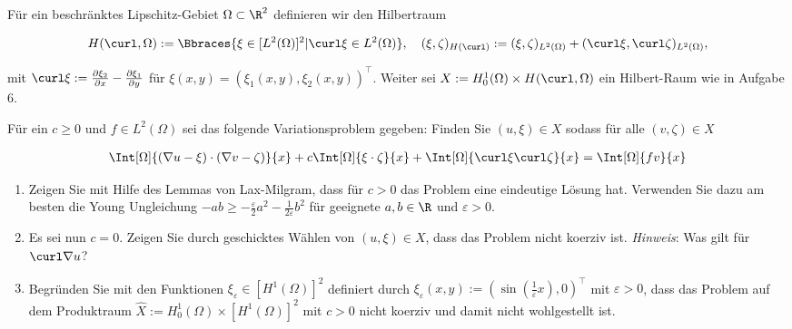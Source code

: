 
\begin{exercise}

Für ein beschränktes Lipschitz-Gebiet $\Omega \subset \R^2$ definieren wir den Hilbertraum

\begin{align*}
  H(\curl, \Omega)
  :=
  \Bbraces{\xi \in [L^2(\Omega)]^2 | \curl \xi \in L^2(\Omega)},
  \quad
  (\xi, \zeta)_{H(\curl)}
  :=
  (\xi, \zeta)_{L^2(\Omega)} + (\curl \xi, \curl \zeta)_{L^2(\Omega)},
\end{align*}

mit $\curl \xi := \frac{\partial \xi_2}{\partial x} - \frac{\partial \xi_1}{\partial y}$ für $\xi(x, y) = (\xi_1(x, y), \xi_2(x, y))^\top$.
Weiter sei $X := H^1_0(\Omega) \times H(\curl, \Omega)$ ein Hilbert-Raum wie in Aufgabe 6.

Für ein $c \geq 0$ und $f \in L^2(\Omega)$ sei das folgende Variationsproblem gegeben: Finden Sie $(u, \xi) \in X$ sodass für alle $(v, \zeta) \in X$

\begin{align}
  \Int[\Omega]{(\nabla u - \xi) \cdot (\nabla v - \zeta)}{x}
  +
  c \Int[\Omega]{\xi \cdot \zeta}{x}
  +
  \Int[\Omega]{\curl \xi \curl \zeta}{x}
  =
  \Int[\Omega]{f v}{x}
\end{align}

\begin{enumerate}[label = \textbf{\alph*)}]

  \item Zeigen Sie mit Hilfe des Lemmas von Lax-Milgram, dass für $c > 0$ das Problem eine eindeutige Lösung hat.
  Verwenden Sie dazu am besten die Young Ungleichung $-ab \geq - \frac{\varepsilon}{2} a^2 - \frac{1}{2\varepsilon}b^2$ für geeignete $a, b \in \R$ und $\varepsilon > 0$.

  \item Es sei nun $c = 0$.
  Zeigen Sie durch geschicktes Wählen von $(u, \xi) \in X$, dass das Problem nicht koerziv ist.
  \textit{Hinweis}:
  Was gilt für $\curl \nabla u$?

  \item Begründen Sie mit den Funktionen $\xi_\varepsilon \in [H^1(\Omega)]^2$ definiert durch $\xi_\varepsilon(x, y) := (\sin(\frac{1}{\varepsilon}x), 0)^\top$ mit $\varepsilon > 0$, dass das Problem auf dem Produktraum $\hat{X} := H^1_0(\Omega) \times [H^1(\Omega)]^2$ mit $c > 0$ nicht koerziv und damit nicht wohlgestellt ist.

\end{enumerate}

\end{exercise}

